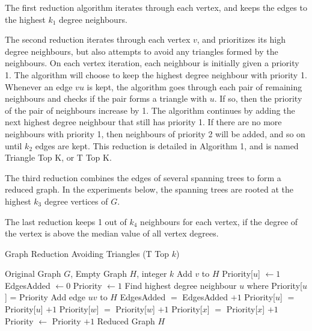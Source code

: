 \documentclass[11pt]{article}
\begin{document}
The first reduction algorithm iterates through each vertex, and keeps the edges to the highest $k_1$ degree neighbours.

The second reduction iterates through each vertex $v$, and prioritizes its high degree neighbours, but also attempts to avoid any triangles formed by the neighbours.  On each vertex iteration, each neighbour is initially given a priority 1.  The algorithm will choose to keep the highest degree neighbour with priority 1.  Whenever an edge $vu$ is kept, the algorithm goes through each pair of remaining neighbours and checks if the pair forms a triangle with $u$.  If so, then the priority of the pair of neighbours increase by 1.  The algorithm continues by adding the next highest degree neighbour that still has priority 1.  If there are no more neighbours with priority 1, then neighbours of priority 2 will be added, and so on until $k_2$ edges are kept.  This reduction is detailed in Algorithm 1, and is named Triangle Top K, or T Top K.

The third reduction combines the edges of several spanning trees to form a reduced graph.  In the experiments below, the spanning trees are rooted at the highest $k_3$ degree vertices of $G$.

The last reduction keeps 1 out of $k_4$ neighbours for each vertex, if the degree of the vertex is above the median value of all vertex degrees.

\begin{algorithm}
\caption{Graph Reduction Avoiding Triangles (T Top $k$)}
\begin{algorithmic}[1]
	\REQUIRE Original Graph $G$, Empty Graph $H$, integer $k$
		\STATE Add $v$ to $H$
			\STATE Priority[$u$] $\leftarrow 1$
		\ENDFOR
		\STATE EdgesAdded $\leftarrow 0$
		\STATE Priority $\leftarrow 1$
			\STATE Find highest degree neighbour $u$ where Priority[$u$] = Priority
			\STATE Add edge $uv$ to $H$
			\STATE EdgesAdded $=$ EdgesAdded $+1$
					\STATE Priority[$u$] $=$ Priority[$u$] $+1$
					\STATE Priority[$w$] $=$ Priority[$w$] $+1$
					\STATE Priority[$x$] $=$ Priority[$x$] $+1$
				\ENDIF
			\ENDFOR
			\STATE Priority $\leftarrow$ Priority $+ 1$
		\ENDWHILE
	\ENDFOR
	\ENSURE Reduced Graph $H$
\end{algorithmic}
\end{algorithm}

\pagebreak
\end{document}
